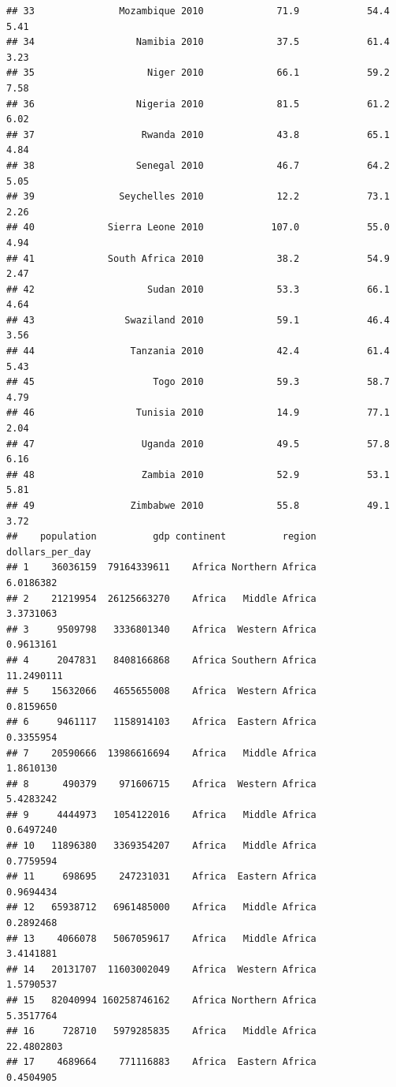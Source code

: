 \documentclass[
]{article}
\begin{document}
\begin{verbatim}
## 33               Mozambique 2010             71.9            54.4      5.41
## 34                  Namibia 2010             37.5            61.4      3.23
## 35                    Niger 2010             66.1            59.2      7.58
## 36                  Nigeria 2010             81.5            61.2      6.02
## 37                   Rwanda 2010             43.8            65.1      4.84
## 38                  Senegal 2010             46.7            64.2      5.05
## 39               Seychelles 2010             12.2            73.1      2.26
## 40             Sierra Leone 2010            107.0            55.0      4.94
## 41             South Africa 2010             38.2            54.9      2.47
## 42                    Sudan 2010             53.3            66.1      4.64
## 43                Swaziland 2010             59.1            46.4      3.56
## 44                 Tanzania 2010             42.4            61.4      5.43
## 45                     Togo 2010             59.3            58.7      4.79
## 46                  Tunisia 2010             14.9            77.1      2.04
## 47                   Uganda 2010             49.5            57.8      6.16
## 48                   Zambia 2010             52.9            53.1      5.81
## 49                 Zimbabwe 2010             55.8            49.1      3.72
##    population          gdp continent          region dollars_per_day
## 1    36036159  79164339611    Africa Northern Africa       6.0186382
## 2    21219954  26125663270    Africa   Middle Africa       3.3731063
## 3     9509798   3336801340    Africa  Western Africa       0.9613161
## 4     2047831   8408166868    Africa Southern Africa      11.2490111
## 5    15632066   4655655008    Africa  Western Africa       0.8159650
## 6     9461117   1158914103    Africa  Eastern Africa       0.3355954
## 7    20590666  13986616694    Africa   Middle Africa       1.8610130
## 8      490379    971606715    Africa  Western Africa       5.4283242
## 9     4444973   1054122016    Africa   Middle Africa       0.6497240
## 10   11896380   3369354207    Africa   Middle Africa       0.7759594
## 11     698695    247231031    Africa  Eastern Africa       0.9694434
## 12   65938712   6961485000    Africa   Middle Africa       0.2892468
## 13    4066078   5067059617    Africa   Middle Africa       3.4141881
## 14   20131707  11603002049    Africa  Western Africa       1.5790537
## 15   82040994 160258746162    Africa Northern Africa       5.3517764
## 16     728710   5979285835    Africa   Middle Africa      22.4802803
## 17    4689664    771116883    Africa  Eastern Africa       0.4504905

\end{verbatim}
\end{document}
